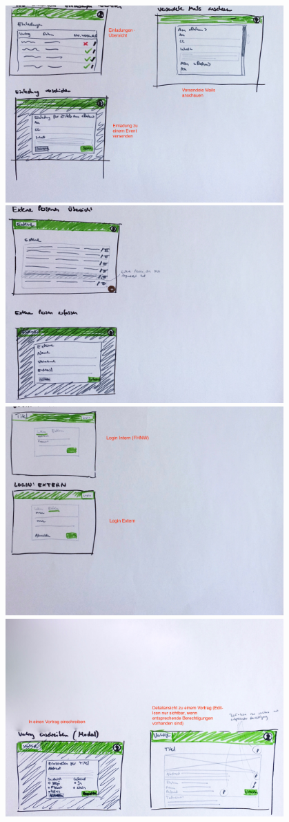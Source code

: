 \documentclass[11pt]{article} %
\begin{document}
\includegraphics[width=0.8\textwidth]{prototyp/Einladungen}
\includegraphics[width=0.8\textwidth]{prototyp/ExternePersonen}
\includegraphics[width=0.8\textwidth]{prototyp/Login}
\includegraphics[width=0.8\textwidth]{prototyp/Vortrag}
\end{document}
